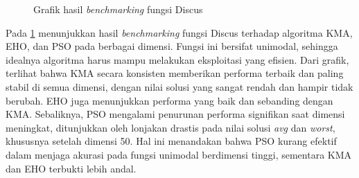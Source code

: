 \begin{figure}[H]
\caption{Grafik hasil \textit{benchmarking} fungsi Discus}
\label{fig:graph_discus}
\end{figure}

Pada \cref{fig:graph_discus} menunjukkan hasil \textit{benchmarking} fungsi Discus terhadap algoritma KMA, EHO, dan PSO pada berbagai dimensi. Fungsi ini bersifat unimodal, sehingga idealnya algoritma harus mampu melakukan eksploitasi yang efisien. Dari grafik, terlihat bahwa KMA secara konsisten memberikan performa terbaik dan paling stabil di semua dimensi, dengan nilai solusi yang sangat rendah dan hampir tidak berubah. EHO juga menunjukkan performa yang baik dan sebanding dengan KMA. Sebaliknya, PSO mengalami penurunan performa signifikan saat dimensi meningkat, ditunjukkan oleh lonjakan drastis pada nilai solusi \textit{avg} dan \textit{worst}, khususnya setelah dimensi 50. Hal ini menandakan bahwa PSO kurang efektif dalam menjaga akurasi pada fungsi unimodal berdimensi tinggi, sementara KMA dan EHO terbukti lebih andal.

